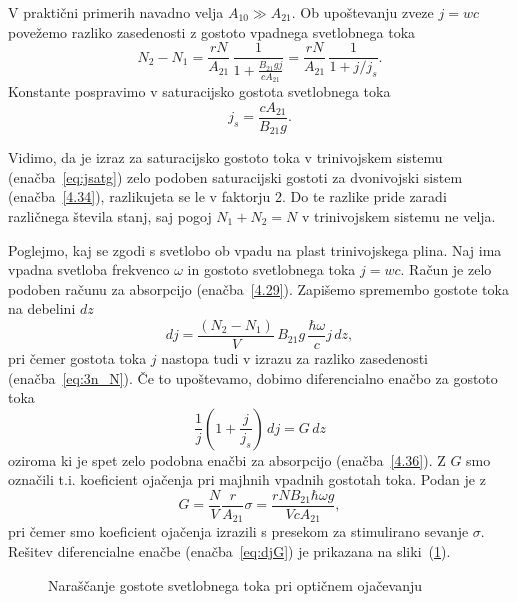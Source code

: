 V praktični primerih navadno velja $A_{10}\gg A_{21}$. Ob upoštevanju zveze $j=wc$ povežemo
razliko zasedenosti z gostoto vpadnega svetlobnega toka
\begin{equation}
N_{2}-N_{1}=\frac{rN}{A_{21}} \, \frac{1}{1+\frac{B_{21}gj}{c A_{21}}} = 
\frac{rN}{A_{21}} \, \frac{1}{1+j/j_s}.
\label{eq:3n_N}
\end{equation}
Konstante pospravimo v saturacijsko gostota svetlobnega toka 
\begin{equation}
j_s = \frac{c A_{21}}{B_{21}g}.
\label{eq:jsatg}
\end{equation}
\begin{remark}
 Vidimo, da je  izraz za saturacijsko gostoto toka v trinivojskem sistemu 
 (enačba~\ref{eq:jsatg}) zelo  podoben saturacijski gostoti za dvonivojski 
 sistem (enačba~\ref{4.34}), razlikujeta se le
v faktorju 2. Do te razlike pride zaradi različnega števila stanj, saj pogoj $N_{1}+N_{2}=N$
v trinivojskem sistemu ne velja. 
\end{remark}
Poglejmo, kaj se zgodi s svetlobo ob vpadu na plast trinivojskega plina. Naj ima vpadna
svetloba frekvenco $\omega$ in gostoto svetlobnega toka $j=wc$. Račun je zelo podoben 
računu za absorpcijo (enačba~\ref{4.29}). Zapišemo spremembo gostote toka na debelini $dz$ 
\begin{equation}
dj=\frac{(N_{2}-N_{1})}{V}\, B_{21}g\, \frac{\hbar\omega}{c}j\, dz,
\label{eq:dj}
\end{equation}
pri čemer gostota toka $j$ nastopa tudi v izrazu za razliko
zasedenosti (enačba~\ref{eq:3n_N}). Če to upoštevamo, 
dobimo diferencialno enačbo za gostoto toka
\begin{equation}
\frac{1}{j}\left(1+\frac{j}{j_{s}}\right)\, dj=G\, dz
\label{4.43}
\end{equation}
oziroma
ki je spet zelo podobna enačbi za absorpcijo (enačba~\ref{4.36}).
Z $G$ smo označili t.i. koeficient ojačenja pri majhnih vpadnih gostotah
toka. Podan je z 
\begin{equation}
G=\frac{N}{V}\frac{r}{A_{21}}\sigma=\frac{rNB_{21}\hbar\omega g}{VcA_{21}},
\label{4.44}
\end{equation}
pri čemer smo koeficient ojačenja izrazili s presekom za stimulirano 
sevanje $\sigma$. 
Rešitev diferencialne enačbe (enačba~\ref{eq:djG}) je prikazana na sliki~(\ref{fig:ojacanje}). 
\begin{figure}[h]
\centering
\def\svgwidth{100truemm} 

\caption{Naraščanje gostote svetlobnega toka pri optičnem ojačevanju}
\label{fig:ojacanje}
\end{figure}


